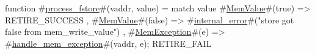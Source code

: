 function #\hyperref[sailRISCVzprocesszyfstore]{process\_fstore}#(vaddr, value) =
  match value {
    #\hyperref[sailRISCVzMemValue]{MemValue}#(true)  => { RETIRE_SUCCESS },
    #\hyperref[sailRISCVzMemValue]{MemValue}#(false) => { #\hyperref[sailRISCVzinternalzyerror]{internal\_error}#("store got false from mem_write_value") },
    #\hyperref[sailRISCVzMemException]{MemException}#(e) => { #\hyperref[sailRISCVzhandlezymemzyexception]{handle\_mem\_exception}#(vaddr, e); RETIRE_FAIL }
  }
